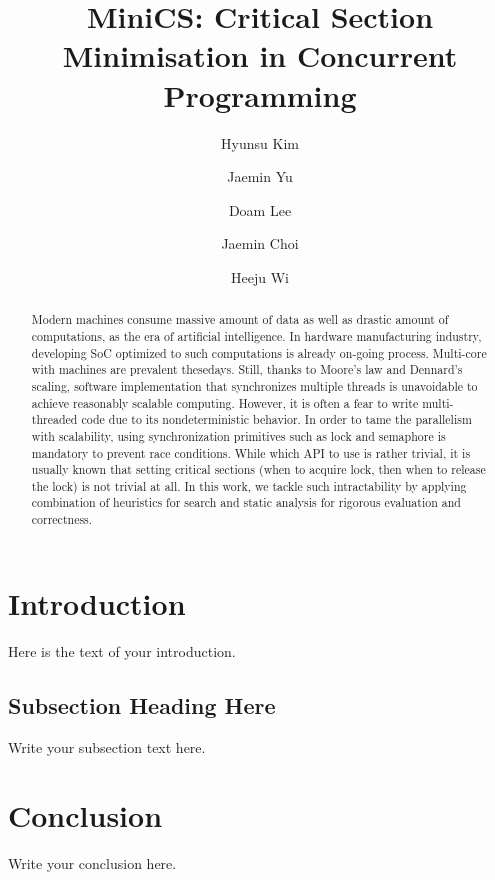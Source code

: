 \documentclass[sigchi]{acmart}
\begin{document}
\title{MiniCS: Critical Section Minimisation in Concurrent Programming}
\author{Hyunsu Kim}

\author{Jaemin Yu}

\author{Doam Lee}

\author{Jaemin Choi}

\author{Heeju Wi}

\begin{abstract}
Modern machines consume massive amount of data as well as drastic amount of computations, as the era of artificial intelligence. In hardware manufacturing industry, developing SoC optimized to such computations is already on-going process. Multi-core with machines are prevalent thesedays. Still, thanks to Moore's law and Dennard's scaling, software implementation that synchronizes multiple threads is unavoidable to achieve reasonably scalable computing. However, it is often a fear to write multi-threaded code due to its nondeterministic behavior. In order to tame the parallelism with scalability, using synchronization primitives such as lock and semaphore is mandatory to prevent race conditions. While which API to use is rather trivial, it is usually known that setting critical sections (when to acquire lock, then when to release the lock) is not trivial at all. In this work, we tackle such intractability by applying combination of heuristics for search and static analysis for rigorous evaluation and correctness.
\end{abstract}

\maketitle

\section{Introduction}
Here is the text of your introduction.

\subsection{Subsection Heading Here}
Write your subsection text here.

\section{}

\section{Conclusion}
Write your conclusion here.
\end{document}
